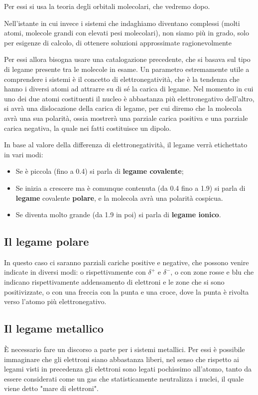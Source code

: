 Per essi si usa la teoria degli orbitali molecolari, che vedremo dopo.

Nell'istante in cui invece i sistemi che indaghiamo diventano complessi (molti atomi, molecole grandi con elevati pesi molecolari), non siamo più in grado, solo per esigenze di calcolo, di ottenere soluzioni approssimate ragionevolmente

Per essi allora bisogna usare una catalogazione precedente, che si basava sul tipo di legame presente tra le molecole in esame.
Un parametro estremamente utile a comprendere i sistemi è il concetto di elettronegatività, che è la tendenza che hanno i diversi atomi ad attrarre su di sé la carica di legame. Nel momento in cui uno dei due atomi costituenti il nucleo è abbastanza più elettronegativo dell'altro, si avrà una dislocazione della carica di legame, per cui diremo che la molecola avrà una sua polarità, ossia mostrerà una parziale carica positiva e una parziale carica negativa, la quale nei fatti costituisce un dipolo.

In base al valore della differenza di elettronegatività, il legame verrà etichettato in vari modi:
\begin{itemize}
    \item Se è piccola (fino a 0.4) si parla di \textbf{legame covalente};
    \item Se inizia a crescere ma è comunque contenuta (da 0.4 fino a 1.9) si parla di \textbf{legame} covalente \textbf{polare}, e la molecola avrà una polarità cospicua. 
    \item Se diventa molto grande (da 1.9 in poi) si parla di \textbf{legame ionico}.
\end{itemize} 

\subsection{Il legame polare}
In questo caso ci saranno parziali cariche positive e negative, che possono venire indicate in diversi modi: o rispettivamente con $\delta^+$ e $\delta^-$, o con zone rosse e blu che indicano rispettivamente addensamento di elettroni e le zone che si sono positivizzate, o con una freccia con la punta e una croce, dove la punta è rivolta verso l'atomo più elettronegativo.

\subsection{Il legame metallico}
È necessario fare un discorso a parte per i sistemi metallici. Per essi è possibile immaginare che gli elettroni siano abbastanza liberi, nel senso che rispetto ai legami visti in precedenza gli elettroni sono legati pochissimo all'atomo, tanto da essere considerati come un gas che statisticamente neutralizza i nuclei, il quale viene detto "mare di elettroni".

